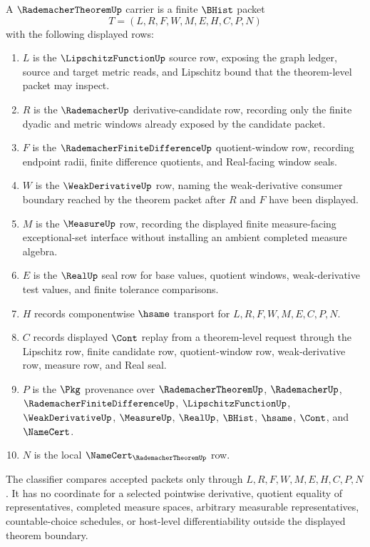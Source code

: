 \begin{definition}
\label{def:rademacher-theorem-carrier}
A $\RademacherTheoremUp$ carrier is a finite $\BHist$ packet
$$
T=(L,R,F,W,M,E,H,C,P,N)
$$
with the following displayed rows:
\begin{enumerate}
\item $L$ is the $\LipschitzFunctionUp$ source row, exposing the graph ledger, source and target metric reads, and Lipschitz bound that the theorem-level packet may inspect.
\item $R$ is the $\RademacherUp$ derivative-candidate row, recording only the finite dyadic and metric windows already exposed by the candidate packet.
\item $F$ is the $\RademacherFiniteDifferenceUp$ quotient-window row, recording endpoint radii, finite difference quotients, and Real-facing window seals.
\item $W$ is the $\WeakDerivativeUp$ row, naming the weak-derivative consumer boundary reached by the theorem packet after $R$ and $F$ have been displayed.
\item $M$ is the $\MeasureUp$ row, recording the displayed finite measure-facing exceptional-set interface without installing an ambient completed measure algebra.
\item $E$ is the $\RealUp$ seal row for base values, quotient windows, weak-derivative test values, and finite tolerance comparisons.
\item $H$ records componentwise $\hsame$ transport for $L,R,F,W,M,E,C,P,N$.
\item $C$ records displayed $\Cont$ replay from a theorem-level request through the Lipschitz row, finite candidate row, quotient-window row, weak-derivative row, measure row, and Real seal.
\item $P$ is the $\Pkg$ provenance over $\RademacherTheoremUp$, $\RademacherUp$, $\RademacherFiniteDifferenceUp$, $\LipschitzFunctionUp$, $\WeakDerivativeUp$, $\MeasureUp$, $\RealUp$, $\BHist$, $\hsame$, $\Cont$, and $\NameCert$.
\item $N$ is the local $\NameCert_{\RademacherTheoremUp}$ row.
\end{enumerate}
The classifier compares accepted packets only through $L,R,F,W,M,E,H,C,P,N$. It has no coordinate for a selected pointwise derivative, quotient equality of representatives, completed measure spaces, arbitrary measurable representatives, countable-choice schedules, or host-level differentiability outside the displayed theorem boundary.
\end{definition}

